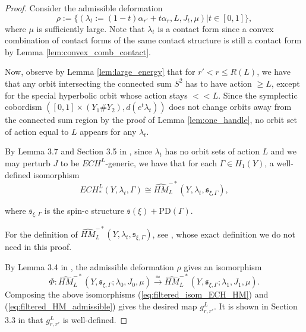 \documentclass{article}
\numberwithin{equation}{section}
\theoremstyle{definition}
\begin{document}
\begin{proof}
Consider the admissible deformation 
\begin{equation}
\label{eq:admissible_deformation}
    \rho:=\{(\lambda_t:=(1-t)\alpha_{r'} + t\alpha_{r}, L, J_t, \mu)|t\in [0,1]\},
\end{equation}
where $\mu$ is sufficiently large. Note that $\lambda_t$ is a contact form since a convex combination of contact forms of the same contact structure is still a contact form by Lemma \ref{lem:convex_comb_contact}.

Now, observe by Lemma \ref{lem:large_energy} that for $r'<r\leq R(L)$, we have that any orbit intersecting the connected sum $S^2$ has to have action $\geq L$, except for the special hyperbolic orbit whose action stays $<<L$. Since the symplectic cobordism $([0,1] \times (Y_1 \# Y_2), d(e^t\lambda_t))$ does not change orbits away from the connected sum region by the proof of Lemma \ref{lem:one_handle}, no orbit set of action equal to $L$ appears for any $\lambda_t$.


By Lemma 3.7 and Section 3.5 in \cite{HT_Chord_II}, since $\lambda_t$ has no orbit sets of action $L$ and we may perturb $J$ to be $ECH^{L}$-generic, we have that for each $\Gamma\in H_1(Y)$, a well-defined isomorphism 
\begin{equation}
\label{eq:filtered_isom_ECH_HM}
    ECH_*^L(Y, \lambda_t, \Gamma) \cong \widehat{HM}_L^{-*}(Y,\lambda_t, \mathfrak{s}_{\xi, \Gamma}),
\end{equation}

where $\mathfrak{s}_{\xi, \Gamma}$ is the spin-c structure $\mathfrak{s}(\xi)+ \text{PD}(\Gamma)$.

For the definition of $\widehat{HM}_L^{-*}(Y,\lambda_t, \mathfrak{s}_{\xi, \Gamma})$, see \cite{HT_Chord_II}, whose exact definition we do not need in this proof.

By Lemma 3.4 in \cite{HT_Chord_II}, the admissible deformation $\rho$ gives an isomorphism
\begin{equation}
\label{eq:filtered_HM_admissible}
    \Phi: \widehat{HM}_L^{-*}(Y, \mathfrak{s}_{\xi, \Gamma}; \lambda_0, J_0, \mu) \stackrel{\simeq}{\longrightarrow} \widehat{HM}_L^{-*}(Y, \mathfrak{s}_{\xi, \Gamma}; \lambda_1, J_1, \mu).
\end{equation}
Composing the above isomorphisms (\ref{eq:filtered_isom_ECH_HM}) and (\ref{eq:filtered_HM_admissible}) gives the desired map $g^L_{r,r'}$. It is shown in Section 3.3 in \cite{HT_Chord_II} that $g^L_{r,r'}$ is well-defined.
\end{proof}
\end{document}
